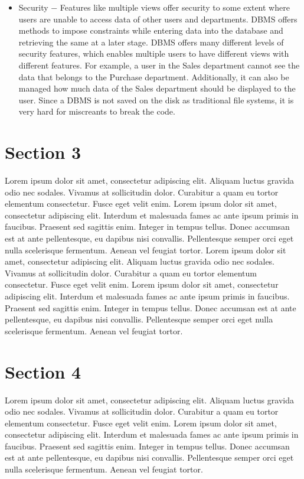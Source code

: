 \begin{itemize}
\item{Security} − Features like multiple views offer security to some extent where users are unable to access data of other users and departments. DBMS offers methods to impose constraints while entering data into the database and retrieving the same at a later stage. DBMS offers many different levels of security features, which enables multiple users to have different views with different features. For example, a user in the Sales department cannot see the data that belongs to the Purchase department.
Additionally, it can also be managed how much data of the Sales department should be displayed to the user. Since a DBMS is not saved on the disk as traditional file systems, it is very hard for miscreants to break the code.
\end{itemize}

\thispagestyle{fancy}

\section{Section 3}
Lorem ipsum dolor sit amet, consectetur adipiscing elit. Aliquam luctus gravida odio nec sodales. Vivamus at sollicitudin dolor. Curabitur a quam eu tortor elementum consectetur. Fusce eget velit enim. Lorem ipsum dolor sit amet, consectetur adipiscing elit. Interdum et malesuada fames ac ante ipsum primis in faucibus. Praesent sed sagittis enim. Integer in tempus tellus. Donec accumsan est at ante pellentesque, eu dapibus nisi convallis. Pellentesque semper orci eget nulla scelerisque fermentum. Aenean vel feugiat tortor.
Lorem ipsum dolor sit amet, consectetur adipiscing elit. Aliquam luctus gravida odio nec sodales. Vivamus at sollicitudin dolor. Curabitur a quam eu tortor elementum consectetur. Fusce eget velit enim. Lorem ipsum dolor sit amet, consectetur adipiscing elit. Interdum et malesuada fames ac ante ipsum primis in faucibus. Praesent sed sagittis enim. Integer in tempus tellus. Donec accumsan est at ante pellentesque, eu dapibus nisi convallis. Pellentesque semper orci eget nulla scelerisque fermentum. Aenean vel feugiat tortor.

\thispagestyle{fancy}

\section{Section 4}
Lorem ipsum dolor sit amet, consectetur adipiscing elit. Aliquam luctus gravida odio nec sodales. Vivamus at sollicitudin dolor. Curabitur a quam eu tortor elementum consectetur. Fusce eget velit enim. Lorem ipsum dolor sit amet, consectetur adipiscing elit. Interdum et malesuada fames ac ante ipsum primis in faucibus. Praesent sed sagittis enim. Integer in tempus tellus. Donec accumsan est at ante pellentesque, eu dapibus nisi convallis. Pellentesque semper orci eget nulla scelerisque fermentum. Aenean vel feugiat tortor.


